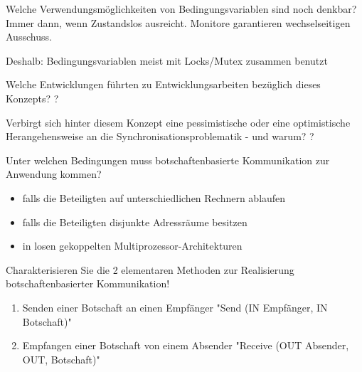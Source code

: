 \documentclass[avery5371]{flashcards}
\begin{document}
\begin{flashcard}{Welche Verwendungsmöglichkeiten von Bedingungsvariablen sind noch denkbar?}
    Immer dann, wenn Zustandslos ausreicht. Monitore garantieren wechselseitigen Ausschuss.

    Deshalb: Bedingungsvariablen meist mit Locks/Mutex zusammen benutzt
\end{flashcard}

\begin{flashcard}{Welche Entwicklungen führten zu Entwicklungsarbeiten bezüglich dieses Konzepts?}
    ?
\end{flashcard}

\begin{flashcard}{Verbirgt sich hinter diesem Konzept eine pessimistische oder eine optimistische Herangehensweise an die Synchronisationsproblematik - und warum?}
    ?
\end{flashcard}

\begin{flashcard}{Unter welchen Bedingungen muss botschaftenbasierte Kommunikation zur Anwendung kommen?}
    \begin{itemize}
        \item falls die Beteiligten auf unterschiedlichen Rechnern ablaufen
        \item falls die Beteiligten disjunkte Adressräume besitzen
        \item in losen gekoppelten Multiprozessor-Architekturen
    \end{itemize}
\end{flashcard}

\begin{flashcard}{Charakterisieren Sie die 2 elementaren Methoden zur Realisierung botschaftenbasierter Kommunikation!}
    \begin{enumerate}
        \item Senden einer Botschaft an einen Empfänger "Send (IN Empfänger, IN Botschaft)"
        \item Empfangen einer Botschaft von einem Absender "Receive (OUT Absender, OUT, Botschaft)"
    \end{enumerate}
\end{flashcard}
\end{document}
